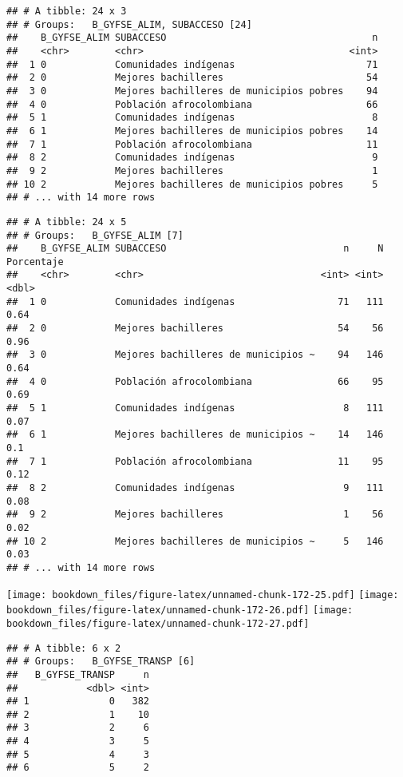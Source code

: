 \documentclass[]{article}
\theoremstyle{definition}
\theoremstyle{definition}
\theoremstyle{definition}
\theoremstyle{remark}
\begin{document}
\begin{verbatim}
## # A tibble: 24 x 3
## # Groups:   B_GYFSE_ALIM, SUBACCESO [24]
##    B_GYFSE_ALIM SUBACCESO                                    n
##    <chr>        <chr>                                    <int>
##  1 0            Comunidades indígenas                       71
##  2 0            Mejores bachilleres                         54
##  3 0            Mejores bachilleres de municipios pobres    94
##  4 0            Población afrocolombiana                    66
##  5 1            Comunidades indígenas                        8
##  6 1            Mejores bachilleres de municipios pobres    14
##  7 1            Población afrocolombiana                    11
##  8 2            Comunidades indígenas                        9
##  9 2            Mejores bachilleres                          1
## 10 2            Mejores bachilleres de municipios pobres     5
## # ... with 14 more rows
\end{verbatim}

\begin{verbatim}
## # A tibble: 24 x 5
## # Groups:   B_GYFSE_ALIM [7]
##    B_GYFSE_ALIM SUBACCESO                               n     N Porcentaje
##    <chr>        <chr>                               <int> <int>      <dbl>
##  1 0            Comunidades indígenas                  71   111       0.64
##  2 0            Mejores bachilleres                    54    56       0.96
##  3 0            Mejores bachilleres de municipios ~    94   146       0.64
##  4 0            Población afrocolombiana               66    95       0.69
##  5 1            Comunidades indígenas                   8   111       0.07
##  6 1            Mejores bachilleres de municipios ~    14   146       0.1 
##  7 1            Población afrocolombiana               11    95       0.12
##  8 2            Comunidades indígenas                   9   111       0.08
##  9 2            Mejores bachilleres                     1    56       0.02
## 10 2            Mejores bachilleres de municipios ~     5   146       0.03
## # ... with 14 more rows
\end{verbatim}

\texttt{[image: bookdown\_files/figure-latex/unnamed-chunk-172-25.pdf]}
\texttt{[image: bookdown\_files/figure-latex/unnamed-chunk-172-26.pdf]}
\texttt{[image: bookdown\_files/figure-latex/unnamed-chunk-172-27.pdf]}

\begin{verbatim}
## # A tibble: 6 x 2
## # Groups:   B_GYFSE_TRANSP [6]
##   B_GYFSE_TRANSP     n
##            <dbl> <int>
## 1              0   382
## 2              1    10
## 3              2     6
## 4              3     5
## 5              4     3
## 6              5     2
\end{verbatim}
\end{document}
